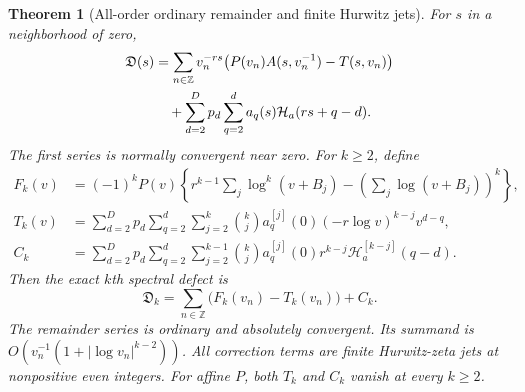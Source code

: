 \documentclass[11pt,a4paper]{article}
\numberwithin{equation}{section}
\theoremstyle{plain}
\newtheorem{theorem}{Theorem}[section]
\theoremstyle{definition}
\theoremstyle{remark}
\begin{document}
\begin{theorem}[All-order ordinary remainder and finite Hurwitz jets]
\label{msj:thm:alljets}
For $s$ in a neighborhood of zero,
\begin{align}
 \mathfrak D(s)
 &=\sum_{n\in\mathbb Z}v_n^{-rs}
             \bigl(P(v_n)A(s,v_n^{-1})-T(s,v_n)\bigr)
 \notag\\
 &\quad+\sum_{d=2}^{D}p_d\sum_{q=2}^{d}
                           a_q(s)\mathcal H_a(rs+q-d).
 \label{msj:eq:regulator}
\end{align}
The first series is normally convergent near zero. For $k\ge2$, define
\begin{align}
 F_k(v)&=(-1)^kP(v)\left\{
     r^{k-1}\sum_j\log^k(v+B_j)
            -\left(\sum_j\log(v+B_j)\right)^k\right\},
 \label{msj:eq:raw-k}\\
 T_k(v)&=\sum_{d=2}^{D}p_d\sum_{q=2}^{d}
       \sum_{j=2}^{k}\binom{k}{j}a_q^{[j]}(0)
                (-r\log v)^{k-j}v^{d-q},
 \label{msj:eq:Tk}\\
 C_k&=\sum_{d=2}^{D}p_d\sum_{q=2}^{d}
       \sum_{j=2}^{k-1}\binom{k}{j}a_q^{[j]}(0)
                 r^{k-j}\mathcal H_a^{[k-j]}(q-d).
 \label{msj:eq:Ck}
\end{align}
Then the exact $k$th spectral defect is
\begin{equation}
 \boxed{\displaystyle
 \mathfrak D_k=\sum_{n\in\mathbb Z}\bigl(F_k(v_n)-T_k(v_n)\bigr)+C_k.}
 \label{msj:eq:alljets}
\end{equation}
The remainder series is ordinary and absolutely convergent. Its
summand is $O(v_n^{-1}(1+|\log v_n|^{k-2}))$. All correction terms are
finite Hurwitz-zeta jets at nonpositive even integers. For affine $P$,
both $T_k$ and $C_k$ vanish at every $k\ge2$.
\end{theorem}
\end{document}
